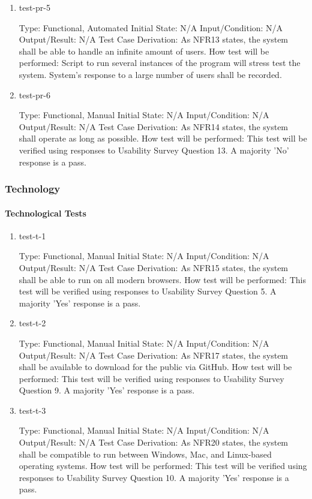 \documentclass[12pt, titlepage]{article}
\begin{document}
\begin{enumerate}
\item{test-pr-5\\}

Type: Functional, Automated
Initial State: N/A	
Input/Condition: N/A
Output/Result: N/A
Test Case Derivation: As NFR13 states, the system shall be able to handle an infinite amount of users.
How test will be performed: Script to run several instances of the program will stress test the system. System's response to a large number of users shall be recorded. 

\item{test-pr-6\\}

Type: Functional, Manual
Initial State: N/A	
Input/Condition: N/A		
Output/Result: N/A
Test Case Derivation: As NFR14 states, the system shall operate as long as possible.
How test will be performed: This test will be verified using responses to Usability Survey Question 13. A majority 'No' response is a pass.

\end{enumerate}


\subsubsection{Technology}

\paragraph{Technological Tests}

\begin{enumerate}

\item{test-t-1\\}

Type: Functional, Manual		
Initial State: N/A	
Input/Condition: N/A		
Output/Result: N/A
Test Case Derivation: As NFR15 states, the system shall be able to run on all modern browsers.
How test will be performed: This test will be verified using responses to Usability Survey Question 5. A majority 'Yes' response is a pass.

\item{test-t-2\\}

Type: Functional, Manual
Initial State: N/A
Input/Condition: N/A
Output/Result: N/A
Test Case Derivation: As NFR17 states, the system shall be available to download for the public via GitHub.		
How test will be performed: This test will be verified using responses to Usability Survey Question 9. A majority 'Yes' response is a pass.

\item{test-t-3\\}

Type: Functional, Manual
Initial State: N/A
Input/Condition: N/A		
Output/Result: N/A
Test Case Derivation: As NFR20 states, the system shall be compatible to run between Windows, Mac, and Linux-based operating systems.		
How test will be performed: This test will be verified using responses to Usability Survey Question 10. A majority 'Yes' response is a pass.

\end{enumerate}
\end{document}
